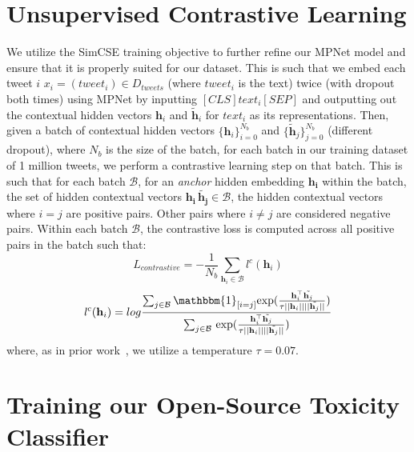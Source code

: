 \section{Unsupervised Contrastive Learning\label{sec:finetune}}
We utilize the SimCSE training objective to further refine our MPNet model and ensure that it is properly suited for our dataset. This is such that we embed each tweet $i$  $x_i = (tweet_i) \in D_{tweets}$ (where $tweet_i$ is the text) twice (with dropout both times) using MPNet by inputting $[CLS] text_i [SEP]$ and outputting out the contextual hidden vectors $\mathbf{h}_i$ and $\tilde{\mathbf{h}}_i$  for $text_i$ as its representations. Then, given a batch of contextual hidden vectors $\{\mathbf{h}_i\}_{i=0}^{N_b}$ and $\{\tilde{\mathbf{h}}_{j}\}_{j=0}^{N_b}$ (different dropout), where $N_b$ is the size of the batch, for each batch in our training dataset of 1 million tweets, we perform a contrastive learning step on that batch. This is such that for each batch $\mathcal{B}$, for an \textit{anchor} hidden embedding $\mathbf{h_i}$ within the batch, the set of hidden contextual vectors $\mathbf{h_i} \, \mathbf{\tilde{h_j}} \in \mathcal{B}$, 
 the hidden contextual vectors where $i = j$ are positive pairs. Other pairs where $i\neq j$ are considered negative pairs. Within each batch $\mathcal{B}$, the contrastive loss is computed across all positive pairs in the batch such that:
\[
    L_{contrastive} = -\frac{1}{N_b} \sum_{\mathbf{h}_i \in \mathcal{B}}\mathit {l}^c(\mathbf{h}_i )
\]
\[
\mathit{l}^c(\mathbf{h}_i) = {log}\frac{ \sum_{j\in\mathcal{B} } \mathbbm{1}_{[i = j]}\mathrm{exp}( \frac{\mathbf{h}_i^\top \tilde{\mathbf{h}_j}}{\tau||\mathbf{h}_i || ||\tilde{\mathbf{h}_j} || })}{\sum_{j\in\mathcal{B}} \, \mathrm{exp}( \frac{\mathbf{h}_i^\top \tilde{\mathbf{h}_j}}{\tau||\mathbf{h}_i || ||\tilde{\mathbf{h}_j} || })}
\]
where, as in prior work~\cite{liang2022jointcl}, we utilize a temperature $\tau=0.07$.


\section{Training our Open-Source Toxicity Classifier\label{sec:app-tox-classifier}}

